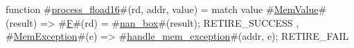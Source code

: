 function #\hyperref[sailRISCVzprocesszyfload16]{process\_fload16}#(rd, addr, value) =
  match value {
    #\hyperref[sailRISCVzMemValue]{MemValue}#(result) => { #\hyperref[sailRISCVzF]{F}#(rd) = #\hyperref[sailRISCVznanzybox]{nan\_box}#(result); RETIRE_SUCCESS },
    #\hyperref[sailRISCVzMemException]{MemException}#(e)  => { #\hyperref[sailRISCVzhandlezymemzyexception]{handle\_mem\_exception}#(addr, e); RETIRE_FAIL }
  }
